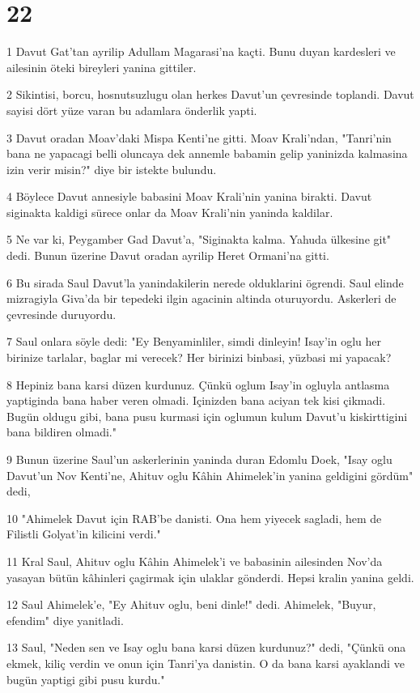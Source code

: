 \chapter{22}

\par 1 Davut Gat'tan ayrilip Adullam Magarasi'na kaçti. Bunu duyan kardesleri ve ailesinin öteki bireyleri yanina gittiler.
\par 2 Sikintisi, borcu, hosnutsuzlugu olan herkes Davut'un çevresinde toplandi. Davut sayisi dört yüze varan bu adamlara önderlik yapti.
\par 3 Davut oradan Moav'daki Mispa Kenti'ne gitti. Moav Krali'ndan, "Tanri'nin bana ne yapacagi belli oluncaya dek annemle babamin gelip yaninizda kalmasina izin verir misin?" diye bir istekte bulundu.
\par 4 Böylece Davut annesiyle babasini Moav Krali'nin yanina birakti. Davut siginakta kaldigi sürece onlar da Moav Krali'nin yaninda kaldilar.
\par 5 Ne var ki, Peygamber Gad Davut'a, "Siginakta kalma. Yahuda ülkesine git" dedi. Bunun üzerine Davut oradan ayrilip Heret Ormani'na gitti.
\par 6 Bu sirada Saul Davut'la yanindakilerin nerede olduklarini ögrendi. Saul elinde mizragiyla Giva'da bir tepedeki ilgin agacinin altinda oturuyordu. Askerleri de çevresinde duruyordu.
\par 7 Saul onlara söyle dedi: "Ey Benyaminliler, simdi dinleyin! Isay'in oglu her birinize tarlalar, baglar mi verecek? Her birinizi binbasi, yüzbasi mi yapacak?
\par 8 Hepiniz bana karsi düzen kurdunuz. Çünkü oglum Isay'in ogluyla antlasma yaptiginda bana haber veren olmadi. Içinizden bana aciyan tek kisi çikmadi. Bugün oldugu gibi, bana pusu kurmasi için oglumun kulum Davut'u kiskirttigini bana bildiren olmadi."
\par 9 Bunun üzerine Saul'un askerlerinin yaninda duran Edomlu Doek, "Isay oglu Davut'un Nov Kenti'ne, Ahituv oglu Kâhin Ahimelek'in yanina geldigini gördüm" dedi,
\par 10 "Ahimelek Davut için RAB'be danisti. Ona hem yiyecek sagladi, hem de Filistli Golyat'in kilicini verdi."
\par 11 Kral Saul, Ahituv oglu Kâhin Ahimelek'i ve babasinin ailesinden Nov'da yasayan bütün kâhinleri çagirmak için ulaklar gönderdi. Hepsi kralin yanina geldi.
\par 12 Saul Ahimelek'e, "Ey Ahituv oglu, beni dinle!" dedi. Ahimelek, "Buyur, efendim" diye yanitladi.
\par 13 Saul, "Neden sen ve Isay oglu bana karsi düzen kurdunuz?" dedi, "Çünkü ona ekmek, kiliç verdin ve onun için Tanri'ya danistin. O da bana karsi ayaklandi ve bugün yaptigi gibi pusu kurdu."
